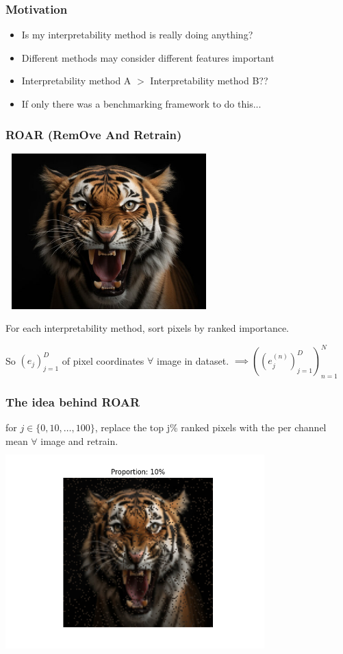 \documentclass{beamer}
\theoremstyle{mystyle}
\begin{document}
\begin{frame}
	\frametitle{Motivation}
	\begin{itemize}
		\item Is my interpretability method is really doing anything? \pause
		\item Different methods may consider different features important \pause
		\item Interpretability method A $>$ Interpretability method B??\pause
		\item If only there was a benchmarking framework to do this...
	\end{itemize}
\end{frame}

\begin{frame}
	\frametitle{ROAR (RemOve And Retrain)}
	\includegraphics[height=6cm, width=8cm]{tiger.png}

	For each interpretability method, sort pixels by ranked importance. \\ \pause 
	

	So $(e_j)_{j=1}^{D}$ of pixel coordinates $\forall $ image in dataset. $\implies ( (e_j^{(n)})_{j=1}^D )_{n=1}^N $
\end{frame}
\begin{frame}
	\frametitle{The idea behind ROAR}

	for $j \in \{0, 10, \ldots,100\} $, replace the top j\% ranked pixels with the per channel mean  $\forall $ image and retrain.
	\includegraphics[height=8cm, width=10cm]{tiger0.1.png}

\end{frame}
\end{document}
